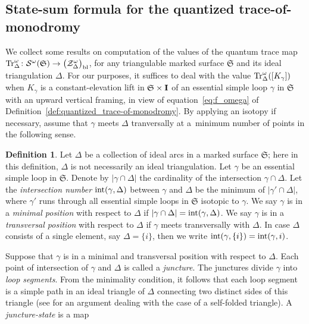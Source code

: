 \documentclass[pdftex]{sigma}
\numberwithin{equation}{section}
\theoremstyle{definition}
\newtheorem{Definition}[Theorem]{Definition}
\begin{document}
\subsection{State-sum formula for the quantized trace-of-monodromy}
\label{subsec:state-sum}
We collect some results on computation of the values of the quantum trace map ${\rm Tr}^\omega_\Delta \colon \mathcal{S}^\omega(\mathfrak{S}) \to \bigl(\mathcal{Z}^\omega_\Delta\bigr)_{\rm bl}$, for any triangulable marked surface $\mathfrak{S}$ and its ideal triangulation $\Delta$. For our purposes, it suffices to deal with the value ${\rm Tr}^\omega_\Delta([K_\gamma])$ when $K_\gamma$ is a constant-elevation lift in $\mathfrak{S} \times {\bf I}$ of an essential simple loop $\gamma$ in $\mathfrak{S}$ with an upward vertical framing, in view of equation~\eqref{eq:f_omega} of Definition~\ref{def:quantized_trace-of-monodromy}. By applying an isotopy if necessary, assume that $\gamma$ meets $\Delta$ tranversally at a~minimum number of points in the following sense.
\begin{Definition}
\label{def:minimal_and_transversal}
Let $\Delta$ be a collection of ideal arcs in a marked surface $\mathfrak{S}$; here in this definition, $\Delta$ is not necessarily an ideal triangulation. Let $\gamma$ be an essential simple loop in $\mathfrak{S}$. Denote by $|\gamma \cap \Delta|$ the cardinality of the intersection $\gamma \cap \Delta$. Let the {\em intersection number} ${\rm int}(\gamma, \Delta)$ between $\gamma$ and $\Delta$ be the minimum of $|\gamma' \cap \Delta|$, where $\gamma'$ runs through all essential simple loops in $\mathfrak{S}$ isotopic to $\gamma$. We say $\gamma$ is in a {\em minimal position} with respect to $\Delta$ if $|\gamma \cap \Delta| = {\rm int}(\gamma,\Delta)$. We say $\gamma$ is in a {\em transversal position} with respect to $\Delta$ if $\gamma$ meets transversally with $\Delta$.
In case $\Delta$ consists of a single element, say $\Delta = \{i\}$, then we write ${\rm int}(\gamma,\{i\}) = {\rm int}(\gamma,i)$.
\end{Definition}
Suppose that $\gamma$ is in a minimal and transversal position with respect to $\Delta$. Each point of intersection of $\gamma$ and $\Delta$ is called a {\em juncture}. The junctures divide $\gamma$ into {\em loop segments}. From the minimality condition, it follows that each loop segment is a simple path in an ideal triangle of $\Delta$ connecting two distinct sides of this triangle (see \cite[Lemma~2.8]{CKKO} for an argument dealing with the case of a self-folded triangle). A {\em juncture-state} is a map
\end{document}
